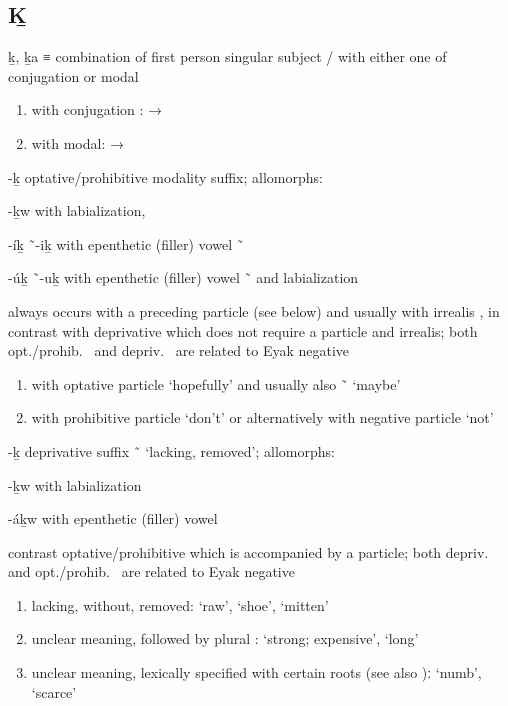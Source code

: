 \subsection{Ḵ}\label{sec:alphalist-kh}
\begin{morphdesc}[resume*=alphalist]
\item[ḵ, ḵa]
	≡ 
	combination of first person singular subject  /  with either one of
		conjugation 
		or modal 
	\begin{enumerate}
	\item	with conjugation :  → 
	\item	with modal:  → 
	\end{enumerate}

\item[-ḵ]
	optative/prohibitive modality suffix;
	\newline
	allomorphs:
	\begin{allolist}
	\item[-ḵw] 	with labialization,
	\item[-íḵ \~\ -iḵ] with epenthetic (filler) vowel  \~\ 
	\item[-úḵ \~\ -uḵ] with epenthetic (filler) vowel  \~\  and labialization
	\end{allolist}
	always occurs with a preceding particle (see below) and usually with irrealis \fm{u-},
	in contrast with deprivative  which does not require a particle and irrealis;
	both opt./prohib.\  and depriv.\  are related to Eyak negative \fm{-ɢ}
	\begin{enumerate}
	\item	with optative particle  ‘hopefully’
			and usually also  \~\  ‘maybe’
	\item	with prohibitive particle  ‘don’t’
			or alternatively with negative particle \fm{tléil} ‘not’
	\end{enumerate}

\item[-ḵ]
	deprivative suffix  \~\  ‘lacking, removed’;
	\newline
	allomorphs:
	\begin{allolist}
	\item[-ḵw]	with labialization
	\item[-áḵw]	with epenthetic (filler) vowel \fm{á}
	\end{allolist}
	contrast optative/prohibitive  which is accompanied by a particle;
	both depriv.\  and opt./prohib.\  are related to Eyak negative 
	\begin{enumerate}
	\item	lacking, without, removed:
		 ‘raw’,  ‘shoe’,  ‘mitten’
	\item	unclear meaning, followed by plural :
		 ‘strong; expensive’,  ‘long’
	\item	unclear meaning, lexically specified with certain roots (see also )ː
		 ‘numb’,  ‘scarce’
	\end{enumerate}


\end{morphdesc}
